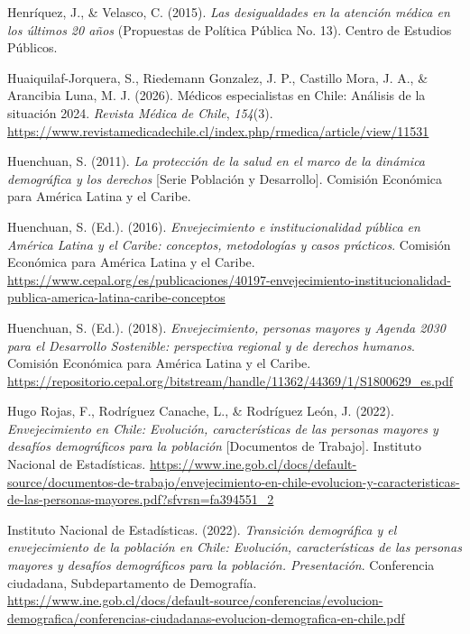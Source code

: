 \documentclass[
  spanish,
  a4paper,
  oneside]{scrbook}
\newlength{\cslhangindent}
\newenvironment{CSLReferences}[2] %
 {\begin{list}{}{%
  \setlength{\itemindent}{0pt}
  \setlength{\leftmargin}{0pt}
  \setlength{\parsep}{0pt}
  \ifodd #1
   \setlength{\leftmargin}{\cslhangindent}
   \setlength{\itemindent}{-1\cslhangindent}
  \fi
  \setlength{\itemsep}{#2\baselineskip}}}
 {\end{list}}
\begin{document}
\begin{CSLReferences}{1}{0}
Henríquez, J., \& Velasco, C. (2015). \emph{Las desigualdades en la
atención médica en los últimos 20 años} (Propuestas de Política Pública
No. 13). Centro de Estudios Públicos.

Huaiquilaf-Jorquera, S., Riedemann Gonzalez, J. P., Castillo Mora, J.
A., \& Arancibia Luna, M. J. (2026). Médicos especialistas en Chile:
Análisis de la situación 2024. \emph{Revista Médica de Chile},
\emph{154}(3).
\url{https://www.revistamedicadechile.cl/index.php/rmedica/article/view/11531}

Huenchuan, S. (2011). \emph{La protección de la salud en el marco de la
dinámica demográfica y los derechos} {[}Serie Población y Desarrollo{]}.
Comisión Económica para América Latina y el Caribe.

Huenchuan, S. (Ed.). (2016). \emph{Envejecimiento e institucionalidad
pública en América Latina y el Caribe: conceptos, metodologías y casos
prácticos}. Comisión Económica para América Latina y el Caribe.
\url{https://www.cepal.org/es/publicaciones/40197-envejecimiento-institucionalidad-publica-america-latina-caribe-conceptos}

Huenchuan, S. (Ed.). (2018). \emph{Envejecimiento, personas mayores y
Agenda 2030 para el Desarrollo Sostenible: perspectiva regional y de
derechos humanos}. Comisión Económica para América Latina y el Caribe.
\url{https://repositorio.cepal.org/bitstream/handle/11362/44369/1/S1800629_es.pdf}

Hugo Rojas, F., Rodríguez Canache, L., \& Rodríguez León, J. (2022).
\emph{Envejecimiento en Chile: Evolución, características de las
personas mayores y desafíos demográficos para la población}
{[}Documentos de Trabajo{]}. Instituto Nacional de Estadísticas.
\url{https://www.ine.gob.cl/docs/default-source/documentos-de-trabajo/envejecimiento-en-chile-evolucion-y-caracteristicas-de-las-personas-mayores.pdf?sfvrsn=fa394551_2}

Instituto Nacional de Estadísticas. (2022). \emph{Transición demográfica
y el envejecimiento de la población en Chile: Evolución, características
de las personas mayores y desafíos demográficos para la población.
Presentación}. Conferencia ciudadana, Subdepartamento de Demografía.
\url{https://www.ine.gob.cl/docs/default-source/conferencias/evolucion-demografica/conferencias-ciudadanas-evolucion-demografica-en-chile.pdf}


\end{CSLReferences}
\end{document}
